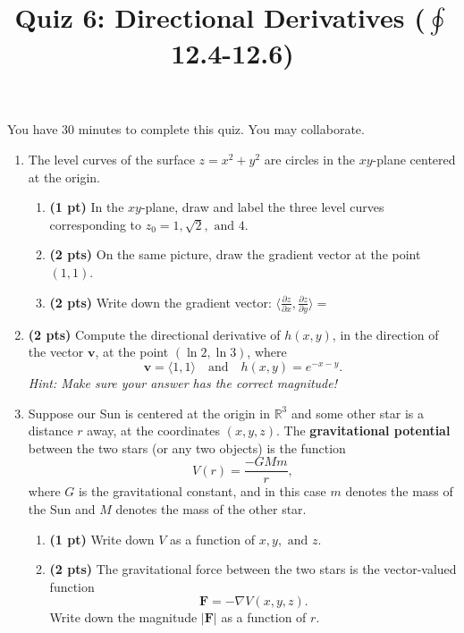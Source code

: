 \documentclass[12pt]{article}
\title{\flushleft\vspace{-2.5pc}\Large
	\bf Quiz 6: Directional Derivatives ($\textstyle\oint$12.4-12.6)}
\author{}
\date{}
\begin{document}
\maketitle

\vspace{-4pc}
 You have 30 minutes to complete this quiz.  You may collaborate.  

\begin{enumerate}[1.]
\item The level curves of the surface $z=x^2+y^2$ are circles in the $xy$-plane centered at the origin.  
	\begin{enumerate}%
	\item {\bf (1 pt)} In the $xy$-plane, draw and label the three level curves corresponding to $z_0=1,\sqrt{2},\text{ and }4$.  
	\vspace{10pc}
	\item {\bf (2 pts)} On the same picture, draw the gradient vector at the point $(1,1)$.
	\item {\bf (2 pts)} Write down the gradient vector: $\langle \frac{\partial z}{\partial x},\frac{\partial z}{\partial y}\rangle=$
	\vspace{1pc}
	\end{enumerate}

\item {\bf (2 pts)} Compute the directional derivative of $h(x,y)$, in the direction of the vector $\mathbf v$, at the point $(\ln 2,\ln 3)$, where 
\[
\mathbf v=\langle 1,1\rangle \quad\text{and}\quad h(x,y)=e^{-x-y}.
\]
{\it Hint: Make sure your answer has the correct magnitude!}

\newpage
\item Suppose our Sun is centered at the origin in $\mathbb R^3$ and some other star is a distance $r$ away, at the coordinates $(x,y,z)$.  The {\bf gravitational potential} between the two stars (or any two objects) is the function
\[
V(r)=\frac{-GMm}{r},
\]
where $G$ is the gravitational constant, and in this case $m$ denotes the mass of the Sun and $M$ denotes the mass of the other star.
	\begin{enumerate}
	\item {\bf (1 pt)} Write down $V$ as a function of $x,y,\text{ and }z$.
	\vspace{3pc}
	\item {\bf (2 pts)} The gravitational force between the two stars is the vector-valued function 
	\[
	\mathbf F=-\nabla V(x,y,z).
	\]
	Write down the magnitude $|\mathbf F|$ as a function of $r$.
	\end{enumerate}
\end{enumerate}
\end{document}
